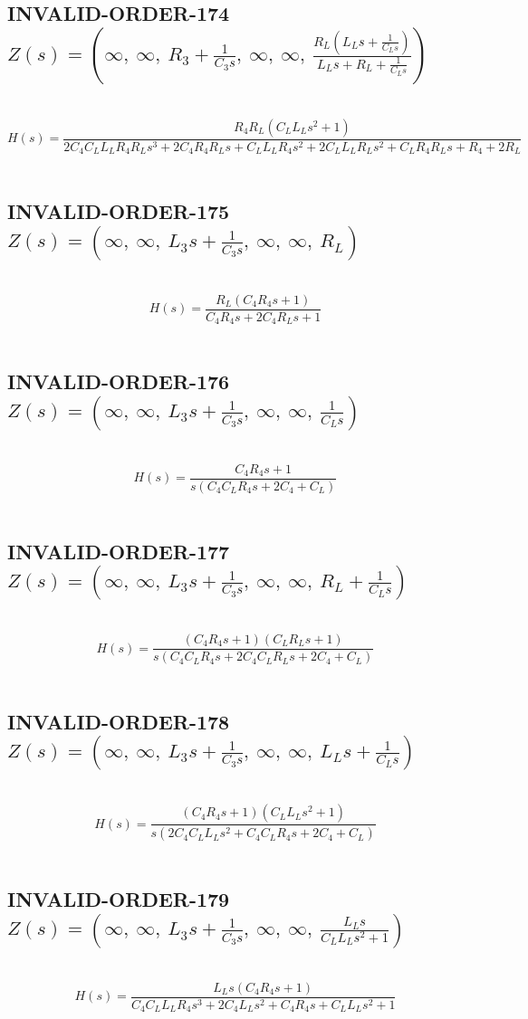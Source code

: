 \documentclass{article}
\begin{document}
\subsection{INVALID-ORDER-174 $Z(s) = \left( \infty, \  \infty, \  R_{3} + \frac{1}{C_{3} s}, \  \infty, \  \infty, \  \frac{R_{L} \left(L_{L} s + \frac{1}{C_{L} s}\right)}{L_{L} s + R_{L} + \frac{1}{C_{L} s}}\right)$ } \ 
\textbf{\[H(s) = \frac{R_{4} R_{L} \left(C_{L} L_{L} s^{2} + 1\right)}{2 C_{4} C_{L} L_{L} R_{4} R_{L} s^{3} + 2 C_{4} R_{4} R_{L} s + C_{L} L_{L} R_{4} s^{2} + 2 C_{L} L_{L} R_{L} s^{2} + C_{L} R_{4} R_{L} s + R_{4} + 2 R_{L}}\] } \ 
\subsection{INVALID-ORDER-175 $Z(s) = \left( \infty, \  \infty, \  L_{3} s + \frac{1}{C_{3} s}, \  \infty, \  \infty, \  R_{L}\right)$ } \ 
\textbf{\[H(s) = \frac{R_{L} \left(C_{4} R_{4} s + 1\right)}{C_{4} R_{4} s + 2 C_{4} R_{L} s + 1}\] } \ 
\subsection{INVALID-ORDER-176 $Z(s) = \left( \infty, \  \infty, \  L_{3} s + \frac{1}{C_{3} s}, \  \infty, \  \infty, \  \frac{1}{C_{L} s}\right)$ } \ 
\textbf{\[H(s) = \frac{C_{4} R_{4} s + 1}{s \left(C_{4} C_{L} R_{4} s + 2 C_{4} + C_{L}\right)}\] } \ 
\subsection{INVALID-ORDER-177 $Z(s) = \left( \infty, \  \infty, \  L_{3} s + \frac{1}{C_{3} s}, \  \infty, \  \infty, \  R_{L} + \frac{1}{C_{L} s}\right)$ } \ 
\textbf{\[H(s) = \frac{\left(C_{4} R_{4} s + 1\right) \left(C_{L} R_{L} s + 1\right)}{s \left(C_{4} C_{L} R_{4} s + 2 C_{4} C_{L} R_{L} s + 2 C_{4} + C_{L}\right)}\] } \ 
\subsection{INVALID-ORDER-178 $Z(s) = \left( \infty, \  \infty, \  L_{3} s + \frac{1}{C_{3} s}, \  \infty, \  \infty, \  L_{L} s + \frac{1}{C_{L} s}\right)$ } \ 
\textbf{\[H(s) = \frac{\left(C_{4} R_{4} s + 1\right) \left(C_{L} L_{L} s^{2} + 1\right)}{s \left(2 C_{4} C_{L} L_{L} s^{2} + C_{4} C_{L} R_{4} s + 2 C_{4} + C_{L}\right)}\] } \ 
\subsection{INVALID-ORDER-179 $Z(s) = \left( \infty, \  \infty, \  L_{3} s + \frac{1}{C_{3} s}, \  \infty, \  \infty, \  \frac{L_{L} s}{C_{L} L_{L} s^{2} + 1}\right)$ } \ 
\textbf{\[H(s) = \frac{L_{L} s \left(C_{4} R_{4} s + 1\right)}{C_{4} C_{L} L_{L} R_{4} s^{3} + 2 C_{4} L_{L} s^{2} + C_{4} R_{4} s + C_{L} L_{L} s^{2} + 1}\] } \ 
\end{document}
